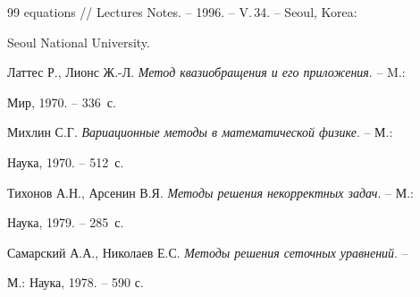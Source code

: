 \begin{thebibliography}{99}
{equations} // Lectures Notes. -- 1996. -- V.\,34. -- Seoul, Korea: 


Seoul National University. 




Латтес Р., Лионс Ж.-Л. {\em Метод квазиобращения и его приложения}. -- M.: 


Мир, 1970. -- 336~с. 




Михлин С.Г. {\em Вариационные методы в математической физике}. -- М.: 


Наука, 1970. -- 512~с. 




Тихонов А.Н., Арсенин В.Я. {\em Методы решения некорректных задач}. -- М.: 


Наука, 1979. -- 285~с. 




Самарский А.А., Николаев Е.С. {\em Методы решения сеточных уравнений}. -- 


М.: Наука, 1978. -- 590 с. 





\end{thebibliography} 


 


\vskip 2cm 


 






 


\label{end} 


 


